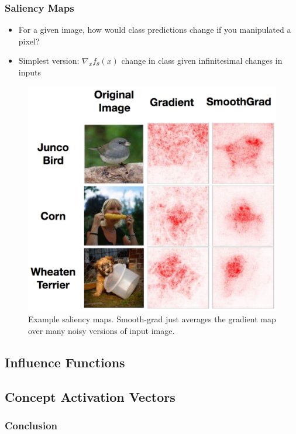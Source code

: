 \documentclass[10pt,mathserif]{beamer}
\begin{document}
\begin{frame}
  \frametitle{Saliency Maps}
  \begin{itemize}
  \item For a given image, how would class predictions change if you manipulated
    a pixel?
  \item Simplest version: $\nabla_{x} f_{\theta}\left(x\right)$ change in class
    given infinitesimal changes in inputs
  \end{itemize} 
\begin{figure}[ht]
  \centering
  \includegraphics[width=0.7\paperwidth]{figure/saliency}
  \caption{Example saliency maps. Smooth-grad just averages the gradient map
    over many noisy versions of input image.\label{fig:saliency} }
\end{figure}

\end{frame}

\subsection{Influence Functions}

\subsection{Concept Activation Vectors}

\begin{frame}
  \frametitle{Conclusion}

\end{frame}
\end{document}

